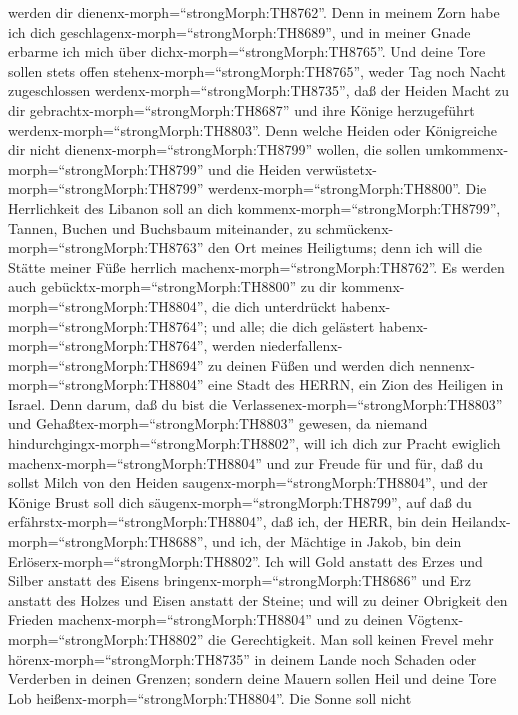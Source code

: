 werden dir dienenx-morph=``strongMorph:TH8762''. Denn in meinem Zorn
habe ich dich geschlagenx-morph=``strongMorph:TH8689'', und in meiner
Gnade erbarme ich mich über dichx-morph=``strongMorph:TH8765''.
 Und deine Tore sollen stets offen
stehenx-morph=``strongMorph:TH8765'', weder Tag noch Nacht zugeschlossen
werdenx-morph=``strongMorph:TH8735'', daß der Heiden Macht zu dir
gebrachtx-morph=``strongMorph:TH8687'' und ihre Könige herzugeführt
werdenx-morph=``strongMorph:TH8803''.  Denn welche Heiden
oder Königreiche dir nicht dienenx-morph=``strongMorph:TH8799'' wollen,
die sollen umkommenx-morph=``strongMorph:TH8799'' und die Heiden
verwüstetx-morph=``strongMorph:TH8799''
werdenx-morph=``strongMorph:TH8800''.  Die Herrlichkeit des
Libanon soll an dich kommenx-morph=``strongMorph:TH8799'', Tannen,
Buchen und Buchsbaum miteinander, zu
schmückenx-morph=``strongMorph:TH8763'' den Ort meines Heiligtums; denn
ich will die Stätte meiner Füße herrlich
machenx-morph=``strongMorph:TH8762''.  Es werden auch
gebücktx-morph=``strongMorph:TH8800'' zu dir
kommenx-morph=``strongMorph:TH8804'', die dich unterdrückt
habenx-morph=``strongMorph:TH8764''; und alle; die dich gelästert
habenx-morph=``strongMorph:TH8764'', werden
niederfallenx-morph=``strongMorph:TH8694'' zu deinen Füßen und werden
dich nennenx-morph=``strongMorph:TH8804'' eine Stadt des HERRN, ein Zion
des Heiligen in Israel.  Denn darum, daß du bist die
Verlassenex-morph=``strongMorph:TH8803'' und
Gehaßtex-morph=``strongMorph:TH8803'' gewesen, da niemand
hindurchgingx-morph=``strongMorph:TH8802'', will ich dich zur Pracht
ewiglich machenx-morph=``strongMorph:TH8804'' und zur Freude für und
für,  daß du sollst Milch von den Heiden
saugenx-morph=``strongMorph:TH8804'', und der Könige Brust soll dich
säugenx-morph=``strongMorph:TH8799'', auf daß du
erfährstx-morph=``strongMorph:TH8804'', daß ich, der HERR, bin dein
Heilandx-morph=``strongMorph:TH8688'', und ich, der Mächtige in Jakob,
bin dein Erlöserx-morph=``strongMorph:TH8802''.  Ich will
Gold anstatt des Erzes und Silber anstatt des Eisens
bringenx-morph=``strongMorph:TH8686'' und Erz anstatt des Holzes und
Eisen anstatt der Steine; und will zu deiner Obrigkeit den Frieden
machenx-morph=``strongMorph:TH8804'' und zu deinen
Vögtenx-morph=``strongMorph:TH8802'' die Gerechtigkeit. 
Man soll keinen Frevel mehr hörenx-morph=``strongMorph:TH8735'' in
deinem Lande noch Schaden oder Verderben in deinen Grenzen; sondern
deine Mauern sollen Heil und deine Tore Lob
heißenx-morph=``strongMorph:TH8804''.  Die Sonne soll nicht
